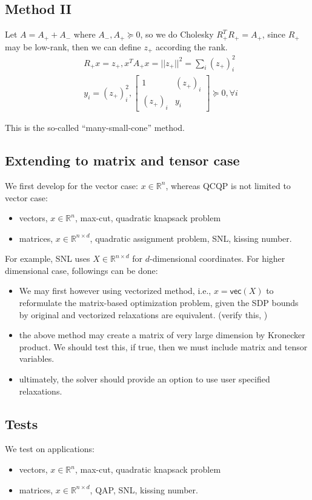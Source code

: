 \documentclass[../main]{subfiles}
\begin{document}
\subsection{Method II}\label{sdp-method-2}
Let \(A = A_+ + A_-\) where \(A_-, A_+ \succeq 0\), so we do Cholesky \(R_+^T R_+ = A_+\), since $R_+$ may be low-rank,
then we can define $z_+$ according the rank.
\[
    \begin{aligned}
         & R_+ x = z_+, x^TA_+ x = ||z_+||^2 = \sum_i (z_+)_i^2            \\
         & y_i = (z_+)_i^2, \begin{bmatrix} 1 & (z_+)_i \\ (z_+)_i & y_i \end{bmatrix} \succeq 0, \forall i
    \end{aligned}
\]

This is the so-called ``many-small-cone'' method.
\subsection{Extending to matrix and tensor case}\label{sdp-extending}

We first develop for the vector case: $x \in \mathbb R^n$, whereas QCQP is not limited to vector case:

\begin{itemize}
    \item vectors, $x\in \mathbb {R}^n$, max-cut, quadratic knapsack problem
    \item matrices, $x\in \mathbb {R}^{n\times d}$, quadratic assignment problem, SNL, kissing number.
\end{itemize}

For example, SNL uses $X \in \mathbb R^{n\times d}$ for $d$-dimensional coordinates. For higher dimensional case, followings can be done:

\begin{itemize}
    \item We may first however using vectorized method, i.e., $x = \mathsf{vec}(X)$ to reformulate the matrix-based optimization problem, given the SDP bounds by original and vectorized relaxations are equivalent. (verify this, \cite{ding_equivalence_2011})
    \item the above method may create a matrix of very large dimension by Kronecker product. We should test this, if true, then we must include matrix and tensor variables.
    \item ultimately, the solver should provide an option to use user specified relaxations.
\end{itemize}

\subsection{Tests}

We test on applications:


\begin{itemize}
    \item vectors, $x\in \mathbb {R}^n$, max-cut, quadratic knapsack problem
    \item matrices, $x\in \mathbb {R}^{n\times d}$, QAP, SNL, kissing number.
\end{itemize}
\end{document}
